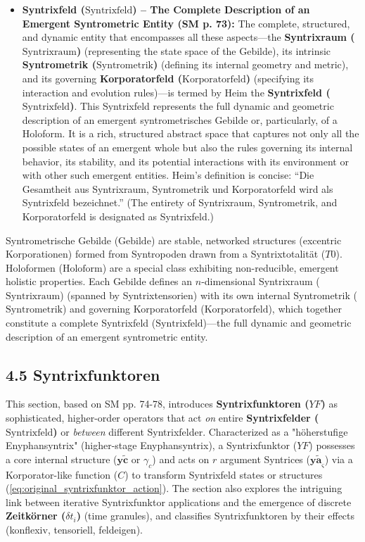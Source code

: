 \documentclass[12pt]{article}
\newcommand{\q}[1]{\enquote{#1}}
\newcommand{\syntrix}{\bm{y\widetilde{a}}}
\newcommand{\syntrixtotalitaet}{T0}
\newcommand{\syntrixfeld}{\text{Syntrixfeld}}
\newcommand{\syntrometrischesGebilde}{\text{Gebilde}}
\newcommand{\holoform}{\text{Holoform}}
\newcommand{\syntrixraum}{\text{Syntrixraum}}
\newcommand{\syntrometrik}{\text{Syntrometrik}}
\newcommand{\korporatorfeld}{\text{Korporatorfeld}}
\newcommand{\syntrixfunktor}{YF}
\newcommand{\zeitkorn}{\delta t_i}
\begin{document}
\begin{itemize}
    \item \textbf{Syntrixfeld (\(\syntrixfeld\)) – The Complete Description of an Emergent Syntrometric Entity (SM p. 73):}
    The complete, structured, and dynamic entity that encompasses all these aspects—the \textbf{Syntrixraum (\(\syntrixraum\))} (representing the state space of the Gebilde), its intrinsic \textbf{Syntrometrik (\(\syntrometrik\))} (defining its internal geometry and metric), and its governing \textbf{Korporatorfeld (\(\korporatorfeld\))} (specifying its interaction and evolution rules)—is termed by Heim the \textbf{Syntrixfeld (\(\syntrixfeld\))}. This Syntrixfeld represents the full dynamic and geometric description of an emergent syntrometrisches Gebilde or, particularly, of a Holoform. It is a rich, structured abstract space that captures not only all the possible states of an emergent whole but also the rules governing its internal behavior, its stability, and its potential interactions with its environment or with other such emergent entities. Heim's definition is concise: \q{Die Gesamtheit aus Syntrixraum, Syntrometrik und Korporatorfeld wird als Syntrixfeld bezeichnet.} (The entirety of Syntrixraum, Syntrometrik, and Korporatorfeld is designated as Syntrixfeld.)
\end{itemize}

Syntrometrische Gebilde (\(\syntrometrischesGebilde\)) are stable, networked structures (excentric Korporationen) formed from Syntropoden drawn from a Syntrixtotalität (\(\syntrixtotalitaet\)). Holoformen (\(\holoform\)) are a special class exhibiting non-reducible, emergent holistic properties. Each Gebilde defines an \(n\)-dimensional Syntrixraum (\(\syntrixraum\)) (spanned by Syntrixtensorien) with its own internal Syntrometrik (\(\syntrometrik\)) and governing Korporatorfeld (\(\korporatorfeld\)), which together constitute a complete Syntrixfeld (\(\syntrixfeld\))—the full dynamic and geometric description of an emergent syntrometric entity.

\subsection{4.5 Syntrixfunktoren}
\label{sec:syntrixfunktoren}

This section, based on SM pp. 74-78, introduces \textbf{Syntrixfunktoren (\(\syntrixfunktor\))} as sophisticated, higher-order operators that act \textit{on} entire \textbf{Syntrixfelder (\(\syntrixfeld\))} or \textit{between} different Syntrixfelder. Characterized as a "höherstufige Enyphansyntrix" (higher-stage Enyphansyntrix), a Syntrixfunktor (\(\syntrixfunktor\)) possesses a core internal structure (\(\mathbf{y\widetilde{c}}\) or \(\gamma_c\)) and acts on \(r\) argument Syntrices (\(\syntrix_\varsigma\)) via a Korporator-like function (\(C\)) to transform Syntrixfeld states or structures (\eqref{eq:original_syntrixfunktor_action}). The section also explores the intriguing link between iterative Syntrixfunktor applications and the emergence of discrete \textbf{Zeitkörner (\(\zeitkorn\))} (time granules), and classifies Syntrixfunktoren by their effects (konflexiv, tensoriell, feldeigen).
\end{document}
